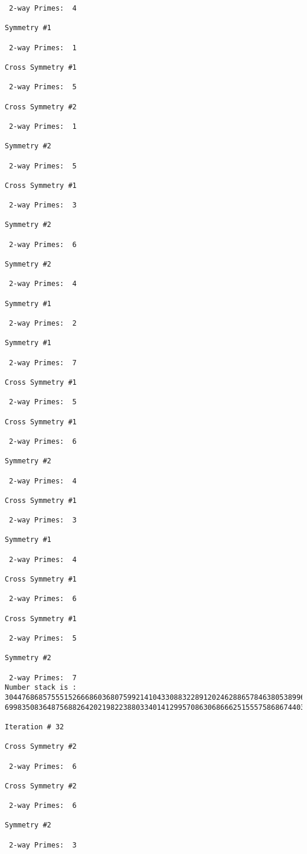 \begin{verbatim}
 2-way Primes: 	4

Symmetry #1

 2-way Primes: 	1

Cross Symmetry #1

 2-way Primes: 	5

Cross Symmetry #2

 2-way Primes: 	1

Symmetry #2

 2-way Primes: 	5

Cross Symmetry #1

 2-way Primes: 	3

Symmetry #2

 2-way Primes: 	6

Symmetry #2

 2-way Primes: 	4

Symmetry #1

 2-way Primes: 	2

Symmetry #1

 2-way Primes: 	7

Cross Symmetry #1

 2-way Primes: 	5

Cross Symmetry #1

 2-way Primes: 	6

Symmetry #2

 2-way Primes: 	4

Cross Symmetry #1

 2-way Primes: 	3

Symmetry #1

 2-way Primes: 	4

Cross Symmetry #1

 2-way Primes: 	6

Cross Symmetry #1

 2-way Primes: 	5

Symmetry #2

 2-way Primes: 	7
Number stack is :
30447686857555152666860368075992141043308832289120246288657846380538996794608835958544046240163340857
69983508364875688264202198223880334014129957086306866625155575868674403758043361042640445859538806497

Iteration #	32

Cross Symmetry #2

 2-way Primes: 	6

Cross Symmetry #2

 2-way Primes: 	6

Symmetry #2

 2-way Primes: 	3


\end{verbatim}
